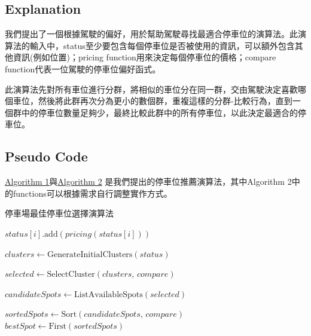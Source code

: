 \documentclass[sigconf,authorversion,nonacm,screen]{acmart}
\begin{document}
\subsection{Explanation}

\quad 我們提出了一個根據駕駛的偏好，用於幫助駕駛尋找最適合停車位的演算法。此演算法的輸入中，status至少要包含每個停車位是否被使用的資訊，可以額外包含其他資訊(例如位置)；pricing function用來決定每個停車位的價格；compare function代表一位駕駛的停車位偏好函式。

此演算法先對所有車位進行分群，將相似的車位分在同一群，交由駕駛決定喜歡哪個車位，然後將此群再次分為更小的數個群，重複這樣的分群-比較行為，直到一個群中的停車位數量足夠少，最終比較此群中的所有停車位，以此決定最適合的停車位。

\subsection{Pseudo Code}
\hyperref[ag:best]{Algorithm 1}與\hyperref[ag:sub]{Algorithm 2} 是我們提出的停車位推薦演算法，其中Algorithm 2中的functions可以根據需求自行調整實作方式。

\begin{algorithm}[h]
\caption{停車場最佳停車位選擇演算法}
\label{ag:best}


\BlankLine
\SetAlgoLined


 {
    $status[i].\text{add}(pricing(status[i]))$\;
}

$clusters \leftarrow \text{GenerateInitialClusters}(status)$\;%

$selected \leftarrow \text{SelectCluster}(clusters,\,compare)$\;


$candidateSpots \leftarrow \text{ListAvailableSpots}(selected)$\;

$sortedSpots \leftarrow \text{Sort}(candidateSpots,\,compare)$\;
$bestSpot \leftarrow \text{First}(sortedSpots)$\;

\;
\end{algorithm}
\end{document}

